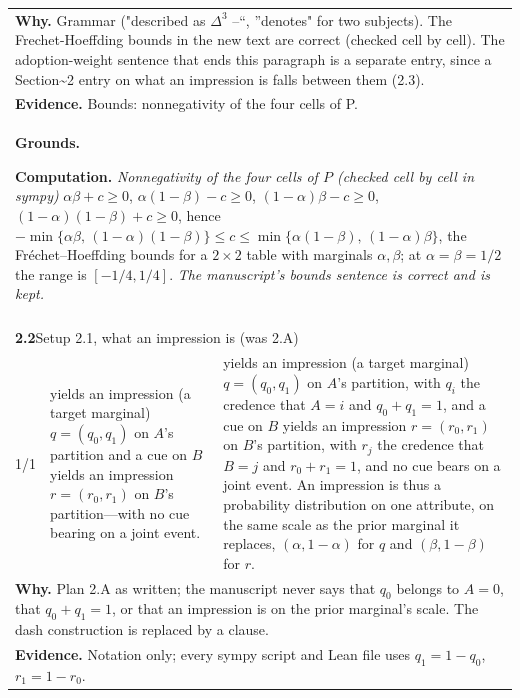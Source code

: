\documentclass[10pt]{article}
\theoremstyle{definition}
\newlength{\fullw}\setlength{\fullw}{25.9cm}
\newcommand{\entryhead}[2]{\multicolumn{3}{|l|}{\rule{0pt}{2.6ex}\large\textbf{#1}\quad #2} \\ \hline}
\begin{document}
{\begin{longtable}{|p{0.9cm}|p{12.2cm}|p{12.2cm}|}
\multicolumn{3}{|p{\fullw}|}{\textbf{Why.} Grammar ("described as $\Delta^3$ --``, ''denotes" for two subjects). The Frechet-Hoeffding bounds in the new text are correct (checked cell by cell). The adoption-weight sentence that ends this paragraph is a separate entry, since a Section\~{}2 entry on what an impression is falls between them (2.3).} \\
\multicolumn{3}{|p{\fullw}|}{\textbf{Evidence.} Bounds: nonnegativity of the four cells of P.} \\ \hline
\multicolumn{3}{|p{\fullw}|}{\textbf{Grounds.}\par \textbf{Computation.} \textit{Nonnegativity of the four cells of $P$ (checked cell by cell in sympy)} \newline $\alpha\beta+c\ge0$, $\alpha(1-\beta)-c\ge0$, $(1-\alpha)\beta-c\ge0$,
$(1-\alpha)(1-\beta)+c\ge0$, hence
$-\min\{\alpha\beta,\,(1-\alpha)(1-\beta)\}\le c\le\min\{\alpha(1-\beta),\,(1-\alpha)\beta\}$,
the Fr\'echet--Hoeffding bounds for a $2\times2$ table with marginals $\alpha,\beta$; at
$\alpha=\beta=1/2$ the range is $[-1/4,1/4]$. \newline \textit{The manuscript's bounds sentence is correct and is kept.}} \\ \hline
\multicolumn{3}{|l|}{} \\ \hline
\entryhead{2.2}{Setup 2.1, what an impression is (was 2.A)\quad{\footnotesize\textit{(formerly E.2)}}}
1/1 & yields an impression (a target marginal) $q=(q_{0},q_{1})$ on $A$'s partition and a cue on $B$ yields an impression $r=(r_{0},r_{1})$ on $B$'s partition---with no cue bearing on a joint event. & yields an impression (a target marginal) $q=(q_{0},q_{1})$ on $A$'s partition, with $q_i$ the credence that $A=i$ and $q_0+q_1=1$, and a cue on $B$ yields an impression $r=(r_{0},r_{1})$ on $B$'s partition, with $r_j$ the credence that $B=j$ and $r_0+r_1=1$, and no cue bears on a joint event. An impression is thus a probability distribution on one attribute, on the same scale as the prior marginal it replaces, $(\alpha,1-\alpha)$ for $q$ and $(\beta,1-\beta)$ for $r$. \\ \hline
\multicolumn{3}{|p{\fullw}|}{\textbf{Why.} Plan 2.A as written; the manuscript never says that $q_0$ belongs to $A=0$, that $q_0+q_1=1$, or that an impression is on the prior marginal's scale. The dash construction is replaced by a clause.} \\
\multicolumn{3}{|p{\fullw}|}{\textbf{Evidence.} Notation only; every sympy script and Lean file uses $q_1=1-q_0$, $r_1=1-r_0$.} \\ \hline

\end{longtable}}
\end{document}
